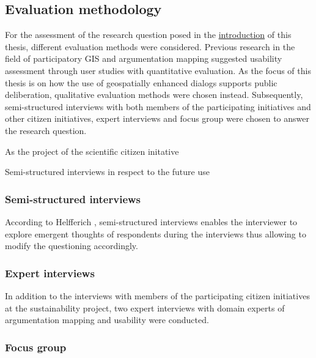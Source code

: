 \subsection{Evaluation methodology}
\label{subchap:ev_methodology}
For the assessment of the research question posed in the \hyperref[chap:introduction]{introduction} of this thesis, different evaluation methods were considered. Previous research in the field of participatory GIS and argumentation mapping suggested usability assessment through user studies with quantitative evaluation. As the focus of this thesis is on how the use of geospatially enhanced dialogs supports public deliberation, qualitative evaluation methods were chosen instead. Subsequently, semi-structured interviews with both members of the participating initiatives and other citizen initiatives, expert interviews and focus group were chosen to answer the research question.


As the project of the scientific citizen initative 

Semi-structured interviews in respect to the future use





\subsubsection{Semi-structured interviews}

According to Helfferich \cite{helfferich2005}, semi-structured interviews enables the interviewer to explore emergent thoughts of respondents during the interviews thus allowing to modify the questioning accordingly. 

\subsubsection{Expert interviews}

In addition to the interviews with members of the participating citizen initiatives at the sustainability project, two expert interviews with domain experts of argumentation mapping and usability were conducted.


\subsubsection{Focus group}

